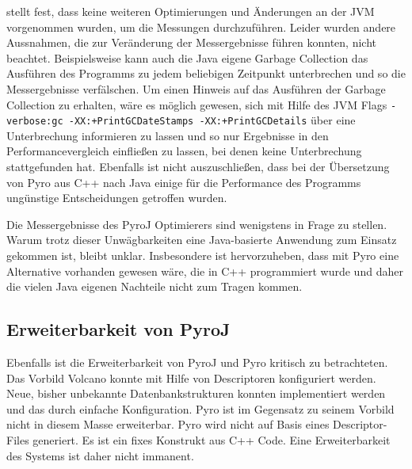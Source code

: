 \cite{shanbhag2014optimizing} stellt fest, dass keine weiteren Optimierungen und Änderungen an der JVM vorgenommen wurden, um die Messungen durchzuführen. Leider wurden andere Aussnahmen, die zur Veränderung der Messergebnisse führen konnten, nicht beachtet. Beispielsweise kann auch die Java eigene  Garbage Collection das Ausführen des Programms zu jedem beliebigen Zeitpunkt unterbrechen und so die Messergebnisse verfälschen. Um einen Hinweis auf das Ausführen der Garbage Collection zu erhalten, wäre es möglich gewesen, sich mit Hilfe des  JVM Flags \texttt{-verbose:gc -XX:+PrintGCDateStamps -XX:+PrintGCDetails} über eine Unterbrechung informieren zu lassen  \cite{andreasson2015JVM}  und so nur Ergebnisse in den Performancevergleich einfließen zu lassen, bei denen keine Unterbrechung stattgefunden hat. Ebenfalls ist nicht auszuschließen, dass bei der Übersetzung von Pyro aus C++ nach Java einige für die Performance des Programms ungünstige Entscheidungen getroffen wurden. 




Die Messergebnisse des PyroJ Optimierers sind wenigstens in Frage zu stellen. Warum trotz dieser Unwägbarkeiten eine Java-basierte Anwendung zum Einsatz gekommen ist, bleibt unklar. Insbesondere ist hervorzuheben, dass mit Pyro eine Alternative vorhanden gewesen wäre, die in C++ programmiert wurde und daher die vielen Java eigenen Nachteile nicht zum Tragen kommen. 


\subsection{Erweiterbarkeit von PyroJ}

Ebenfalls ist die Erweiterbarkeit von PyroJ und Pyro kritisch zu betrachteten. Das Vorbild Volcano konnte mit Hilfe von Descriptoren konfiguriert werden. Neue, bisher unbekannte Datenbankstrukturen konnten implementiert werden und das durch einfache Konfiguration. Pyro ist im Gegensatz zu seinem Vorbild nicht in diesem Masse erweiterbar. Pyro wird nicht auf Basis eines Descriptor-Files generiert. Es ist ein fixes Konstrukt aus C++ Code. Eine Erweiterbarkeit des Systems ist daher nicht immanent.


